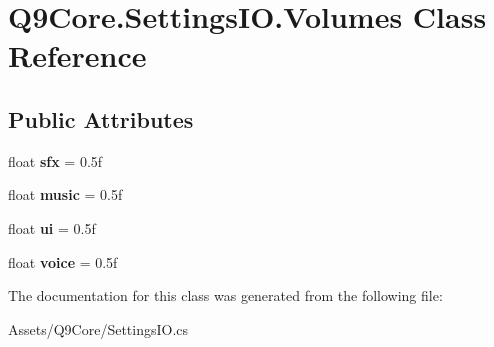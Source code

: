 \hypertarget{class_q9_core_1_1_settings_i_o_1_1_volumes}{}\section{Q9\+Core.\+Settings\+I\+O.\+Volumes Class Reference}
\label{class_q9_core_1_1_settings_i_o_1_1_volumes}
\subsection*{Public Attributes}
\begin{DoxyCompactItemize}
\item 
\mbox{\label{class_q9_core_1_1_settings_i_o_1_1_volumes_af8346ff37dfcbdfa346bf6eff638c389}} 
float {\bfseries sfx} = 0.\+5f
\item 
\mbox{\label{class_q9_core_1_1_settings_i_o_1_1_volumes_a67de1bd15b67f391f76ff71f4d10b969}} 
float {\bfseries music} = 0.\+5f
\item 
\mbox{\label{class_q9_core_1_1_settings_i_o_1_1_volumes_a85366486c4dce6ea7ecb95e555f65456}} 
float {\bfseries ui} = 0.\+5f
\item 
\mbox{\label{class_q9_core_1_1_settings_i_o_1_1_volumes_a043694e9752d2bec25899e4861d6b5b1}} 
float {\bfseries voice} = 0.\+5f
\end{DoxyCompactItemize}


The documentation for this class was generated from the following file\+:\begin{DoxyCompactItemize}
\item 
Assets/\+Q9\+Core/Settings\+I\+O.\+cs\end{DoxyCompactItemize}
